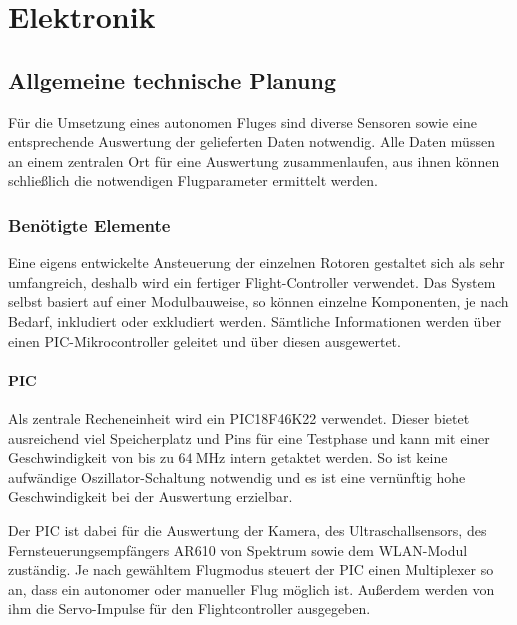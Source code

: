 \chapter{Elektronik}
\renewcommand{\kapitelautor}{Autor: Lucas Ullrich}

\section{Allgemeine technische Planung}
Für die Umsetzung eines autonomen Fluges sind diverse Sensoren sowie eine entsprechende Auswertung der gelieferten Daten notwendig.
Alle Daten müssen an einem zentralen Ort für eine Auswertung zusammenlaufen, aus ihnen können schließlich die notwendigen Flugparameter ermittelt werden.

  \subsection{Benötigte Elemente}
  Eine eigens entwickelte Ansteuerung der einzelnen Rotoren gestaltet sich als sehr umfangreich, deshalb wird ein fertiger Flight-Controller verwendet.
  Das System selbst basiert auf einer Modulbauweise, so können einzelne Komponenten, je nach Bedarf, inkludiert oder exkludiert werden.
  Sämtliche Informationen werden über einen PIC-Mikrocontroller geleitet und über diesen ausgewertet.

    \subsubsection{PIC}
    Als zentrale Recheneinheit wird ein PIC18F46K22 verwendet. Dieser bietet ausreichend viel Speicherplatz und Pins für eine Testphase und kann mit einer Geschwindigkeit
    von bis zu $\SI{64}{\mega\hertz}$ intern getaktet werden. So ist keine aufwändige Oszillator-Schaltung notwendig und es ist eine vernünftig hohe Geschwindigkeit bei der
    Auswertung erzielbar.

    Der PIC ist dabei für die Auswertung der Kamera, des Ultraschallsensors, des Fernsteuerungsempfängers AR610 von Spektrum sowie dem WLAN-Modul zuständig.
    Je nach gewähltem Flugmodus steuert der PIC einen Multiplexer so an, dass ein autonomer oder manueller Flug möglich ist.
    Außerdem werden von ihm die Servo-Impulse für den Flightcontroller ausgegeben.

